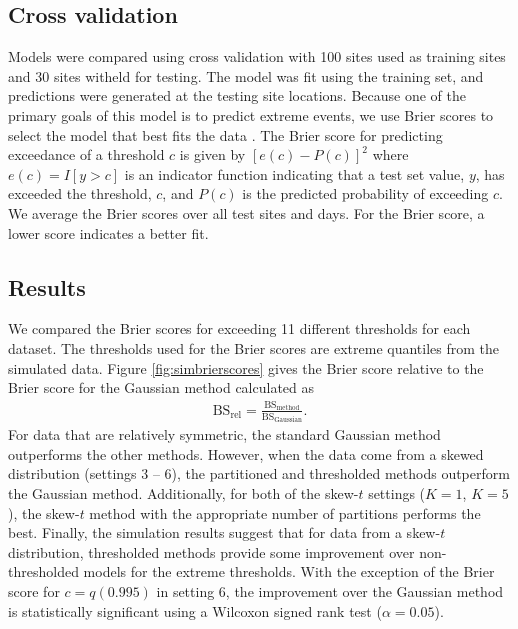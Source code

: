 \documentclass[11pt]{article}
\begin{document}
\subsection{Cross validation}\label{s:modelselect}
Models were compared using cross validation with 100 sites used as training sites and 30 sites witheld for testing.
The model was fit using the training set, and predictions were generated at the testing site locations.
Because one of the primary goals of this model is to predict extreme events, we use Brier scores to select the model that best fits the data \citep{Gneiting2007}.
The Brier score for predicting exceedance of a threshold $c$ is given by $[e(c) - P(c)]^2$ where $e(c) = I[y>c]$ is an indicator function indicating that a test set value, $y$, has exceeded the threshold, $c$, and $P(c)$ is the predicted probability of exceeding $c$.
We average the Brier scores over all test sites and days.
For the Brier score, a lower score indicates a better fit.

\subsection{Results}\label{s:simresults}
We compared the Brier scores for exceeding 11 different thresholds for each dataset.
The thresholds used for the Brier scores are extreme quantiles from the simulated data.
Figure \ref{fig:simbrierscores} gives the Brier score relative to the Brier score for the Gaussian method calculated as
\begin{align*}
  \text{BS}_{\text{rel}} = \frac{\text{BS}_{\text{method}}}{\text{BS}_{\text{Gaussian}}}.
\end{align*}
For data that are relatively symmetric, the standard Gaussian method outperforms the other methods.
However, when the data come from a skewed distribution (settings 3 -- 6), the partitioned and thresholded methods outperform the Gaussian method.
Additionally, for both of the skew-$t$ settings ($K = 1$, $K = 5$), the skew-$t$ method with the appropriate number of partitions performs the best.
Finally, the simulation results suggest that for data from a skew-$t$ distribution, thresholded methods provide some improvement over non-thresholded models for the extreme thresholds.
With the exception of the Brier score for $c = q(0.995)$ in setting 6, the improvement over the Gaussian method is statistically significant using a Wilcoxon signed rank test ($\alpha = 0.05$).
\end{document}
